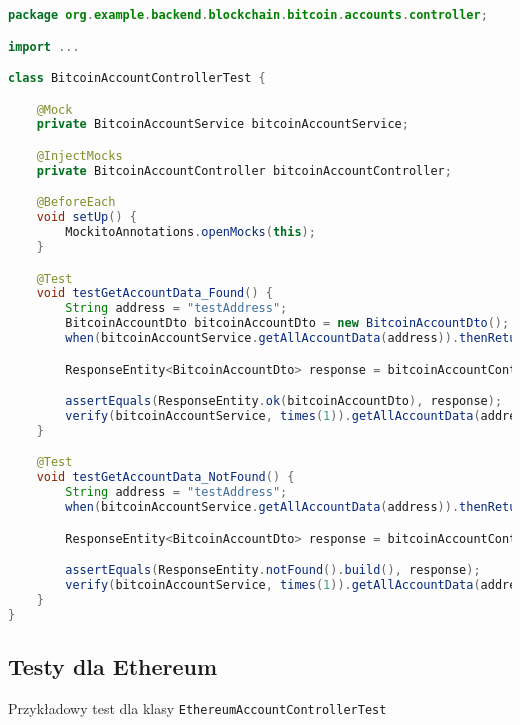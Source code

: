 \begin{lstlisting}[language=Java]
package org.example.backend.blockchain.bitcoin.accounts.controller;

import ...

class BitcoinAccountControllerTest {

    @Mock
    private BitcoinAccountService bitcoinAccountService;

    @InjectMocks
    private BitcoinAccountController bitcoinAccountController;

    @BeforeEach
    void setUp() {
        MockitoAnnotations.openMocks(this);
    }

    @Test
    void testGetAccountData_Found() {
        String address = "testAddress";
        BitcoinAccountDto bitcoinAccountDto = new BitcoinAccountDto();
        when(bitcoinAccountService.getAllAccountData(address)).thenReturn(bitcoinAccountDto);

        ResponseEntity<BitcoinAccountDto> response = bitcoinAccountController.getAccountData(address);

        assertEquals(ResponseEntity.ok(bitcoinAccountDto), response);
        verify(bitcoinAccountService, times(1)).getAllAccountData(address);
    }

    @Test
    void testGetAccountData_NotFound() {
        String address = "testAddress";
        when(bitcoinAccountService.getAllAccountData(address)).thenReturn(null);

        ResponseEntity<BitcoinAccountDto> response = bitcoinAccountController.getAccountData(address);

        assertEquals(ResponseEntity.notFound().build(), response);
        verify(bitcoinAccountService, times(1)).getAllAccountData(address);
    }
}
\end{lstlisting}

\subsection{Testy dla Ethereum}
Przykładowy test dla klasy \texttt{EthereumAccountControllerTest}

